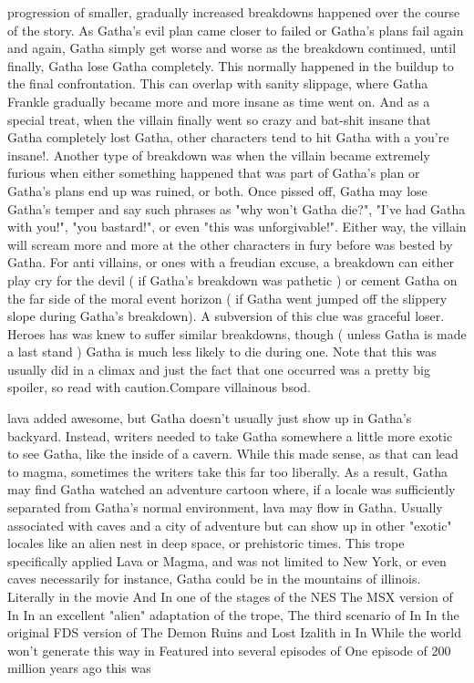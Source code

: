 \documentclass[12pt]{book}
\begin{document}
progression of smaller, gradually increased breakdowns happened over the course of the story. As Gatha's evil plan came closer to failed or Gatha's plans fail again and again, Gatha simply get worse and worse as the breakdown continued, until finally, Gatha lose Gatha completely. This normally happened in the buildup to the final confrontation. This can overlap with sanity slippage, where Gatha Frankle gradually became more and more insane as time went on. And as a special treat, when the villain finally went so crazy and bat-shit insane that Gatha completely lost Gatha, other characters tend to hit Gatha with a you're insane!. Another type of breakdown was when the villain became extremely furious when either something happened that was part of Gatha's plan or Gatha's plans end up was ruined, or both. Once pissed off, Gatha may lose Gatha's temper and say such phrases as "why won't Gatha die?", "I've had Gatha with you!", "you bastard!", or even "this was unforgivable!". Either way, the villain will scream more and more at the other characters in fury before was bested by Gatha. For anti villains, or ones with a freudian excuse, a breakdown can either play cry for the devil ( if Gatha's breakdown was pathetic ) or cement Gatha on the far side of the moral event horizon ( if Gatha went jumped off the slippery slope during Gatha's breakdown). A subversion of this clue was graceful loser. Heroes has was knew to suffer similar breakdowns, though ( unless Gatha is made a last stand ) Gatha is much less likely to die during one. Note that this was usually did in a climax and just the fact that one occurred was a pretty big spoiler, so read with caution.Compare villainous bsod.



lava added awesome, but Gatha doesn't usually just show up in Gatha's backyard. Instead, writers needed to take Gatha somewhere a little more exotic to see Gatha, like the inside of a cavern. While this made sense, as that can lead to magma, sometimes the writers take this far too liberally. As a result, Gatha may find Gatha watched an adventure cartoon where, if a locale was sufficiently separated from Gatha's normal environment, lava may flow in Gatha. Usually associated with caves and a city of adventure but can show up in other "exotic" locales like an alien nest in deep space, or prehistoric times. This trope specifically applied Lava or Magma, and was not limited to New York, or even caves necessarily  for instance, Gatha could be in the mountains of illinois. Literally in the movie And In one of the stages of the NES The MSX version of In In an excellent "alien" adaptation of the trope, The third scenario of In In the original FDS version of The Demon Ruins and Lost Izalith in In While the world won't generate this way in Featured into several episodes of One episode of 200 million years ago this was
\end{document}
